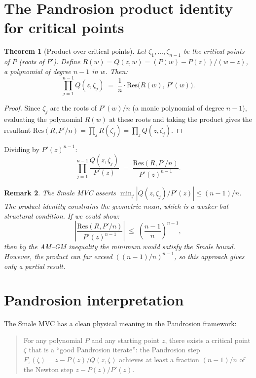 \documentclass[11pt,a4paper]{article}
\newtheorem{theorem}{Theorem}[section]
\newtheorem{remark}[theorem]{Remark}
\begin{document}
\section{The Pandrosion product identity for critical points}

\begin{theorem}[Product over critical points]
Let $\zeta_1, \dots, \zeta_{n-1}$ be the critical points of $P$ (roots of $P'$). Define $R(w) = Q(z, w) = (P(w) - P(z))/(w - z)$, a polynomial of degree $n - 1$ in $w$. Then:
\begin{equation}
\prod_{j=1}^{n-1} Q(z, \zeta_j) \;=\; \frac{1}{n} \cdot \mathrm{Res}\bigl(R(w),\, P'(w)\bigr).
\end{equation}
\end{theorem}

\begin{proof}
Since $\zeta_j$ are the roots of $P'(w)/n$ (a monic polynomial of degree $n - 1$), evaluating the polynomial $R(w)$ at these roots and taking the product gives the resultant $\mathrm{Res}(R, P'/n) = \prod_j R(\zeta_j) = \prod_j Q(z, \zeta_j)$. \qedhere
\end{proof}

Dividing by $P'(z)^{n-1}$:
\begin{equation}
\prod_{j=1}^{n-1} \frac{Q(z, \zeta_j)}{P'(z)} \;=\; \frac{\mathrm{Res}(R, P'/n)}{P'(z)^{n-1}}.
\end{equation}

\begin{remark}
The Smale MVC asserts $\min_j |Q(z, \zeta_j)/P'(z)| \le (n - 1)/n$. The product identity constrains the \emph{geometric mean}, which is a weaker but structural condition. If we could show:
\begin{equation*}
\left|\frac{\mathrm{Res}(R, P'/n)}{P'(z)^{n-1}}\right| \;\le\; \left(\frac{n - 1}{n}\right)^{n-1},
\end{equation*}
then by the AM--GM inequality the minimum would satisfy the Smale bound. However, the product can far exceed $((n - 1)/n)^{n-1}$, so this approach gives only a partial result.
\end{remark}

\section{Pandrosion interpretation}

The Smale MVC has a clean physical meaning in the Pandrosion framework:

\begin{quote}
For any polynomial $P$ and any starting point $z$, there exists a critical point $\zeta$ that is a ``good Pandrosion iterate'': the Pandrosion step $F_z(\zeta) = z - P(z)/Q(z, \zeta)$ achieves at least a fraction $(n - 1)/n$ of the Newton step $z - P(z)/P'(z)$.
\end{quote}
\end{document}
